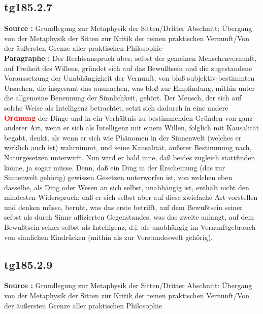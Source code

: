\documentclass[a4paper,12pt,twoside]{book}
\newcommand{\match}[1]{\textcolor{red}{\textbf{#1}}}
\begin{document}
	\subsection*{tg185.2.7} 
	\textbf{Source : }Grundlegung zur Metaphysik der Sitten/Dritter Abschnitt: Übergang von der Metaphysik der Sitten zur Kritik der reinen praktischen Vernunft/Von der äußersten Grenze aller praktischen Philosophie\\  
	
	\noindent\textbf{Paragraphe : }
	Der Rechtsanspruch aber, selbst der gemeinen Menschenvernunft, auf Freiheit des Willens, gründet sich auf das Bewußtsein und die zugestandene Voraussetzung der Unabhängigkeit der Vernunft, von bloß subjektiv-bestimmten Ursachen, die insgesamt das ausmachen, was bloß zur Empfindung, mithin unter die allgemeine Benennung der Sinnlichkeit, gehört. Der Mensch, der sich auf solche Weise als Intelligenz betrachtet, setzt sich dadurch in eine andere \match{Ordnung} der Dinge und in ein Verhältnis zu bestimmenden Gründen von ganz anderer Art, wenn er sich als Intelligenz mit einem Willen, folglich mit Kausalität begabt, denkt, als wenn er sich wie Phänomen in der Sinnenwelt (welches er wirklich auch ist) wahrnimmt, und seine Kausalität, äußerer Bestimmung nach, Naturgesetzen unterwirft. Nun wird er bald inne, daß beides zugleich stattfinden könne, ja sogar müsse. Denn, daß ein Ding in der Erscheinung (das zur Sinnenwelt gehörig) gewissen Gesetzen unterworfen ist, von welchen eben dasselbe, als Ding oder Wesen an sich selbst, unabhängig ist, enthält nicht den mindesten Widerspruch; daß er sich selbst aber auf diese zwiefache Art vorstellen und denken müsse, beruht, was das erste betrifft, auf dem Bewußtsein seiner selbst als durch Sinne affizierten Gegenstandes, was das zweite anlangt, auf dem Bewußtsein seiner selbst als Intelligenz, d.i. als unabhängig im Vernunftgebrauch von sinnlichen Eindrücken (mithin als zur Verstandeswelt gehörig). 
	
	\subsection*{tg185.2.9} 
	\textbf{Source : }Grundlegung zur Metaphysik der Sitten/Dritter Abschnitt: Übergang von der Metaphysik der Sitten zur Kritik der reinen praktischen Vernunft/Von der äußersten Grenze aller praktischen Philosophie\\  
	
\end{document}
